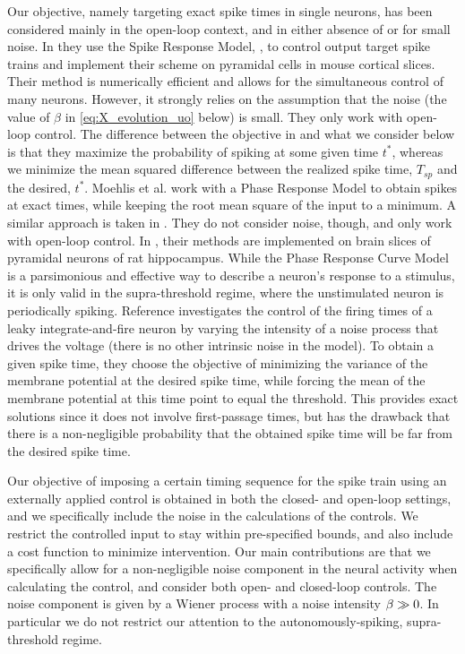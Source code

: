 Our objective, namely targeting exact spike times in single neurons, has been
considered mainly in the open-loop context, and in either absence of or for
small noise. In \cite{Ahmadian2011} they use the Spike Response Model,
\cite{Gerstner2002}, to control output target spike trains and implement their
scheme on pyramidal cells in mouse cortical slices. Their method is numerically
efficient and allows for the simultaneous control of many neurons. However, it strongly relies on the assumption
that the noise (the value of $\beta$ in \cref{eq:X_evolution_uo} below) is small.
They only work with open-loop control.
The difference between the objective in \cite{Ahmadian2011} and what we consider
below is that they maximize the probability of spiking at some given time $t^*$, whereas we minimize the mean squared
difference between the realized spike time, $T_{sp}$ and the desired, $t^*$.
Moehlis et al. \cite{Moehlis2006} work with a Phase Response Model to obtain
spikes at exact times, while keeping the root mean square of the input to a
minimum. A similar approach is taken in \cite{Dasanayake2011}. They do not
consider noise, though, and only work with open-loop control. In
\cite{Nabi2013}, their methods are implemented on brain slices of pyramidal
neurons of rat hippocampus. While the
Phase Response Curve Model is a parsimonious and effective way to describe a
neuron's response to a stimulus, it is only valid in the supra-threshold regime,
where the unstimulated neuron is periodically spiking. Reference
\cite{Feng2003} investigates the control of the firing times of a
leaky integrate-and-fire neuron by varying the intensity of a noise process that
drives the voltage (there is no other intrinsic noise in the model). 
To obtain a given spike time, they choose the objective of minimizing the
variance of the membrane potential at the desired spike time, while forcing the
mean of the membrane potential at this time point to equal the threshold. This
provides exact solutions since it does not involve first-passage times, but has
the drawback that there is a non-negligible probability that the obtained spike
time will be far from the desired spike time.

Our objective of imposing a certain timing sequence for the spike train using an
externally applied control is obtained in both the closed- and
open-loop settings, and we specifically include the noise in the
calculations of the controls. We restrict the controlled input to stay
within pre-specified bounds, and also include a cost function to
minimize intervention.
Our main contributions are that we specifically allow for a
non-negligible noise component in the neural activity when calculating
the control, and consider both open- and closed-loop controls. The
noise component is given by a Wiener process with a noise intensity
$\beta \gg 0$. 
In particular we do not restrict our attention to the autonomously-spiking,
supra-threshold regime.

